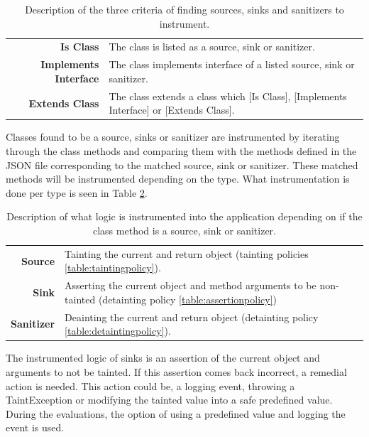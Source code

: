 \begin{table}[H]
    \centering
    \caption{Description of the three criteria of finding sources, sinks and sanitizers to instrument.}
    \label{table:criterias}
    \begin{tabular}{rp{8cm}}
        \textbf{Is Class} & The class is listed as a source, sink or sanitizer. \\
        \textbf{Implements Interface} & The class implements interface of a listed source, sink or sanitizer. \\
        \textbf{Extends Class} & The class extends a class which [Is Class], [Implements Interface] or [Extends Class]. \\
    \end{tabular}
\end{table}

Classes found to be a source, sinks or sanitizer are instrumented by iterating through the class methods and comparing them with the methods defined in the JSON file corresponding to the matched source, sink or sanitizer. These matched methods will be instrumented depending on the type. What instrumentation is done per type is seen in Table \ref{table:instru}. 

\begin{table}[H]
    \centering
    \caption{Description of what logic is instrumented into the application depending on if the class method is a source, sink or sanitizer.}
    \label{table:instru}
    \begin{tabular}{rp{9.5cm}}
        \textbf{Source} & Tainting the current and return object (tainting policies \ref{table:taintingpolicy}). \\
        \textbf{Sink} & Asserting the current object and method arguments to be non-tainted (detainting policy \ref{table:assertionpolicy}) \\
        \textbf{Sanitizer} & Deainting the current and return object (detainting policy \ref{table:detaintingpolicy}). \\
    \end{tabular}
\end{table}

The instrumented logic of sinks is an assertion of the current object and arguments to not be tainted. If this assertion comes back incorrect, a remedial action is needed. This action could be, a logging event, throwing a TaintException or modifying the tainted value into a safe predefined value. During the evaluations, the option of using a predefined value and logging the event is used.



